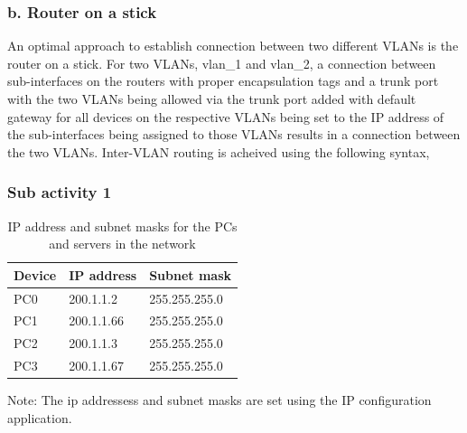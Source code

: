 \documentclass{lab_sheet}
\newcommand{\syntax}[2]{
    
}
\newcommand{\setting}[2]{
    \begin{tabular}{C{3cm}C{5cm}C{5cm}}
        \toprule
          #1 & IP address & Subnet mask\\
          \midrule
          #2
          \bottomrule
       \end{tabular}
}
\begin{document}
\subsubsection*{b. Router on a stick}
An optimal approach to establish connection between two different VLANs is the router on a stick. For two VLANs, vlan\_1 and vlan\_2, a connection between sub-interfaces on the routers with proper encapsulation tags and a trunk port with the two VLANs being allowed via the trunk port added with default gateway for all devices on the respective VLANs being set to the IP address of the sub-interfaces being assigned to those VLANs results in a connection between the two VLANs. Inter-VLAN routing is acheived using the following syntax,
\syntax{inter}{configuration of router on a stick}
\pagebreak
{}

\subsubsection*{Sub activity 1}

\begin{table}[H]
	\centering
	\begin{threeparttable}
		\setting{Device}{
			PC0 & 200.1.1.2  & 255.255.255.0 \\
			PC1 & 200.1.1.66  & 255.255.255.0 \\
			PC2 & 200.1.1.3  & 255.255.255.0 \\
			PC3 & 200.1.1.67  & 255.255.255.0 \\
		}
		\begin{tablenotes}
			\small
			\item Note: The ip addressess and subnet masks are set using the IP configuration application.
		\end{tablenotes}
		\caption{IP address and subnet masks for the PCs and servers in the network}
		\label{tbl:pcsettinga}
	\end{threeparttable}
\end{table}
\end{document}
